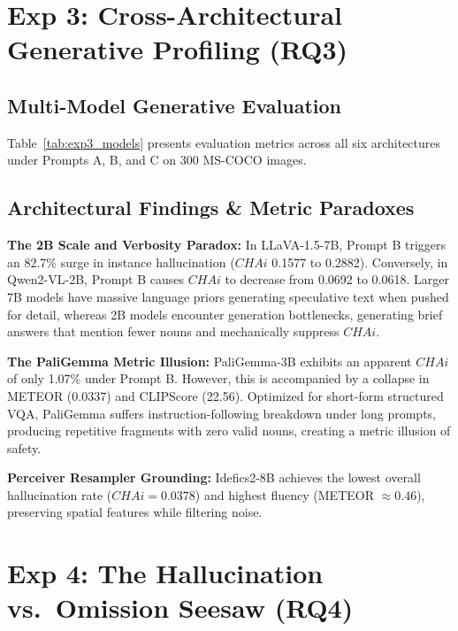 \documentclass[conference]{IEEEtran}
\begin{document}
\section{Exp 3: Cross-Architectural Generative Profiling (RQ3)}

\subsection{Multi-Model Generative Evaluation}
Table~\ref{tab:exp3_models} presents evaluation metrics across all six architectures under Prompts A, B, and C on 300 MS-COCO images.

\subsection{Architectural Findings \& Metric Paradoxes}
\textbf{The 2B Scale and Verbosity Paradox:} In LLaVA-1.5-7B, Prompt B triggers an 82.7\% surge in instance hallucination ($CHAi$ 0.1577 to 0.2882). Conversely, in Qwen2-VL-2B, Prompt B causes $CHAi$ to decrease from 0.0692 to 0.0618. Larger 7B models have massive language priors generating speculative text when pushed for detail, whereas 2B models encounter generation bottlenecks, generating brief answers that mention fewer nouns and mechanically suppress $CHAi$.

\textbf{The PaliGemma Metric Illusion:} PaliGemma-3B exhibits an apparent $CHAi$ of only 1.07\% under Prompt B. However, this is accompanied by a collapse in METEOR (0.0337) and CLIPScore (22.56). Optimized for short-form structured VQA, PaliGemma suffers instruction-following breakdown under long prompts, producing repetitive fragments with zero valid nouns, creating a metric illusion of safety.

\textbf{Perceiver Resampler Grounding:} Idefics2-8B achieves the lowest overall hallucination rate ($CHAi = 0.0378$) and highest fluency (METEOR $\approx 0.46$), preserving spatial features while filtering noise.

\section{Exp 4: The Hallucination vs.\ Omission Seesaw (RQ4)}
\end{document}
